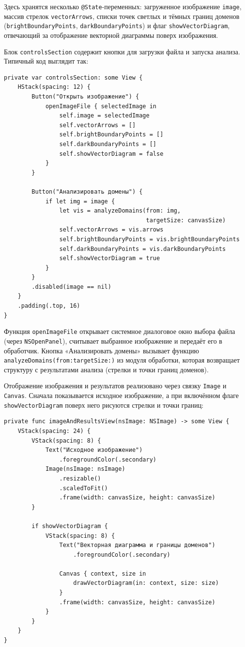 \documentclass[12pt,a4paper]{article}
\numberwithin{equation}{section}
\begin{document}
Здесь хранятся несколько \texttt{@State}-переменных: загруженное изображение \texttt{image}, массив стрелок \texttt{vectorArrows}, списки точек светлых и тёмных границ доменов (\texttt{brightBoundaryPoints}, \texttt{darkBoundaryPoints}) и флаг \texttt{showVectorDiagram}, отвечающий за отображение векторной диаграммы поверх изображения.

Блок \texttt{controlsSection} содержит кнопки для загрузки файла и запуска анализа. Типичный код выглядит так:

\begin{verbatim}
private var controlsSection: some View {
    HStack(spacing: 12) {
        Button("Открыть изображение") {
            openImageFile { selectedImage in
                self.image = selectedImage
                self.vectorArrows = []
                self.brightBoundaryPoints = []
                self.darkBoundaryPoints = []
                self.showVectorDiagram = false
            }
        }

        Button("Анализировать домены") {
            if let img = image {
                let vis = analyzeDomains(from: img,
                                         targetSize: canvasSize)
                self.vectorArrows = vis.arrows
                self.brightBoundaryPoints = vis.brightBoundaryPoints
                self.darkBoundaryPoints = vis.darkBoundaryPoints
                self.showVectorDiagram = true
            }
        }
        .disabled(image == nil)
    }
    .padding(.top, 16)
}
\end{verbatim}

Функция \texttt{openImageFile} открывает системное диалоговое окно выбора файла (через \texttt{NSOpenPanel}), считывает выбранное изображение и передаёт его в обработчик. Кнопка «Анализировать домены» вызывает функцию \texttt{analyzeDomains(from:targetSize:)} из модуля обработки, которая возвращает структуру с результатами анализа (стрелки и точки границ доменов).

Отображение изображения и результатов реализовано через связку \texttt{Image} и \texttt{Canvas}. Сначала показывается исходное изображение, а при включённом флаге \texttt{showVectorDiagram} поверх него рисуются стрелки и точки границ:

\begin{verbatim}
private func imageAndResultsView(nsImage: NSImage) -> some View {
    VStack(spacing: 24) {
        VStack(spacing: 8) {
            Text("Исходное изображение")
                .foregroundColor(.secondary)
            Image(nsImage: nsImage)
                .resizable()
                .scaledToFit()
                .frame(width: canvasSize, height: canvasSize)
        }

        if showVectorDiagram {
            VStack(spacing: 8) {
                Text("Векторная диаграмма и границы доменов")
                    .foregroundColor(.secondary)

                Canvas { context, size in
                    drawVectorDiagram(in: context, size: size)
                }
                .frame(width: canvasSize, height: canvasSize)
            }
        }
    }
}
\end{verbatim}
\end{document}
